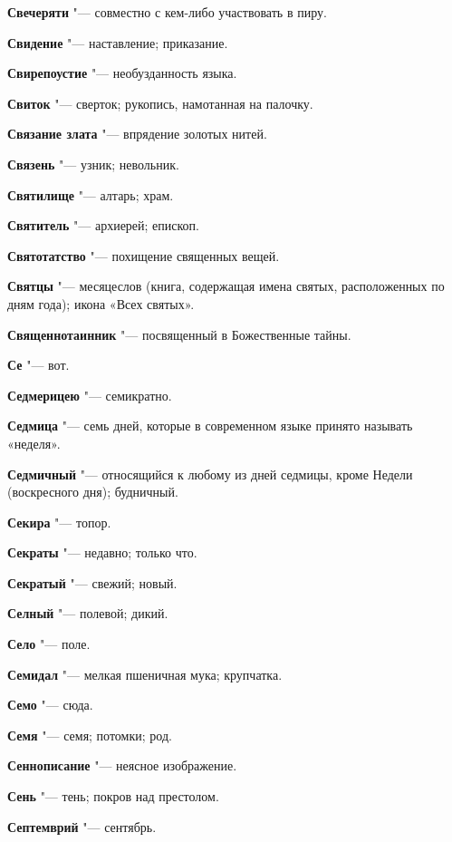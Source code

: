 \begin{mymulticols}
\noindent\textbf{Свечеряти} "--- совместно с кем-либо участвовать в пиру. 

\noindent\textbf{Свидение} "--- наставление; приказание. 

\noindent\textbf{Свирепоустие} "--- необузданность языка. 

\noindent\textbf{Свиток} "--- сверток; рукопись, намотанная на палочку. 

\noindent\textbf{Связание злата} "--- впрядение золотых нитей. 

\noindent\textbf{Связень} "--- узник; невольник. 

\noindent\textbf{Святилище} "--- алтарь; храм. 

\noindent\textbf{Святитель} "--- архиерей; епископ. 

\noindent\textbf{Святотатство} "--- похищение священных вещей. 

\noindent\textbf{Святцы} "--- месяцеслов (книга, содержащая имена святых, расположенных по дням года); икона «Всех святых». 

\noindent\textbf{Священнотаинник} "--- посвященный в Божественные тайны. 

\noindent\textbf{Се} "--- вот. 

\noindent\textbf{Седмерицею} "--- семикратно. 

\noindent\textbf{Седмица} "--- семь дней, которые в современном языке принято называть «неделя». 

\noindent\textbf{Седмичный} "--- относящийся к любому из дней седмицы, кроме Недели (воскресного дня); будничный. 

\noindent\textbf{Секира} "--- топор. 

\noindent\textbf{Секраты} "--- недавно; только что. 

\noindent\textbf{Секратый} "--- свежий; новый. 

\noindent\textbf{Селный} "--- полевой; дикий. 

\noindent\textbf{Село} "--- поле. 

\noindent\textbf{Семидал} "--- мелкая пшеничная мука; крупчатка. 

\noindent\textbf{Семо} "--- сюда. 

\noindent\textbf{Семя} "--- семя; потомки; род. 

\noindent\textbf{Сеннописание} "--- неясное изображение. 

\noindent\textbf{Сень} "--- тень; покров над престолом. 

\noindent\textbf{Септемврий} "--- сентябрь. 


\end{mymulticols}
